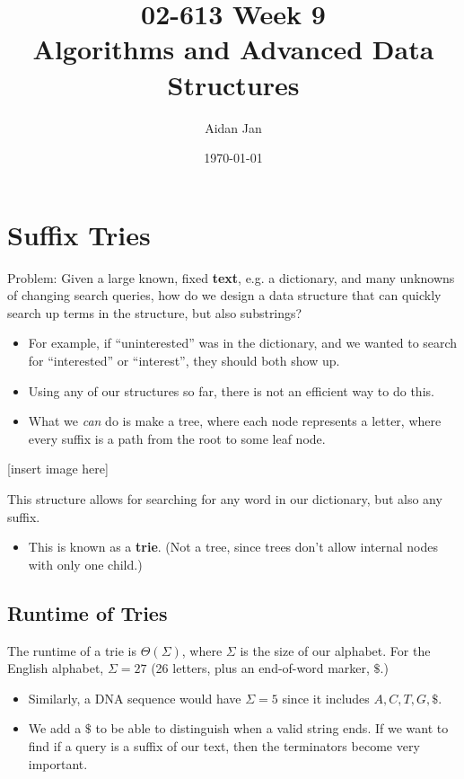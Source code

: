 \documentclass[10pt]{article}
\title{02-613 Week 9 \\ \large{Algorithms and Advanced Data Structures}}
\author{Aidan Jan}
\date{\today}
\begin{document}
\maketitle

\section*{Suffix Tries}
Problem: Given a large known, fixed \textbf{text}, e.g. a dictionary, and many unknowns of changing search queries, how do we design a data structure that can quickly search up terms in the structure, but also substrings?
\begin{itemize}
	\item For example, if ``uninterested'' was in the dictionary, and we wanted to search for ``interested'' or ``interest'', they should both show up.
	\item Using any of our structures so far, there is not an efficient way to do this.
	\item What we \textit{can} do is make a tree, where each node represents a letter, where every suffix is a path from the root to some leaf node.
\end{itemize}
[insert image here]

This structure allows for searching for any word in our dictionary, but also any suffix.
\begin{itemize}
	\item This is known as a \textbf{trie}.  (Not a tree, since trees don't allow internal nodes with only one child.)
\end{itemize}

\subsection*{Runtime of Tries}
The runtime of a trie is $\Theta(\Sigma)$, where $\Sigma$ is the size of our alphabet.  For the English alphabet, $\Sigma = 27$  (26 letters, plus an end-of-word marker, $\mathdollar$.)
\begin{itemize}
	\item Similarly, a DNA sequence would have $\Sigma = 5$ since it includes $A, C, T, G, \mathdollar$.
	\item We add a $\mathdollar$ to be able to distinguish when a valid string ends.  If we want to find if a query is a suffix of our text, then the terminators become very important.
\end{itemize}
\end{document}
